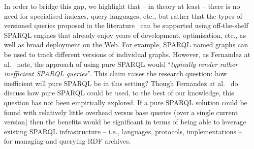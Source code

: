 \documentclass{llncs}
\begin{document}


In order to bridge this gap, we highlight that -- in theory at least -- there is no need for specialised indexes, query languages, etc., but rather that the types of versioned queries proposed in the literature~\cite{FernandezPU15} can be supported using off-the-shelf SPARQL engines that already enjoy years of development, optimisation, etc., as well as broad deployment on the Web. For example, SPARQL named graphs can be used to track different versions of individual graphs. However, as Fernandez at al.~\cite{FernandezUPK19} note, the approach of using pure SPARQL would ``\textit{typically render rather inefficient SPARQL queries}''. This claim raises the research question: how inefficient will pure SPARQL be in this setting? Though Fernandez at al.~\cite{FernandezUPK19} do discuss how pure SPARQL could be used, to the best of our knowledge, this question has not been empirically explored. If a pure SPARQL solution could be found with relatively little overhead versus base queries (over a single current version) then the benefits would be significant in terms of being able to leverage existing SPARQL infrastructure -- i.e., languages, protocols, implementations -- for managing and querying RDF archives.
\end{document}
